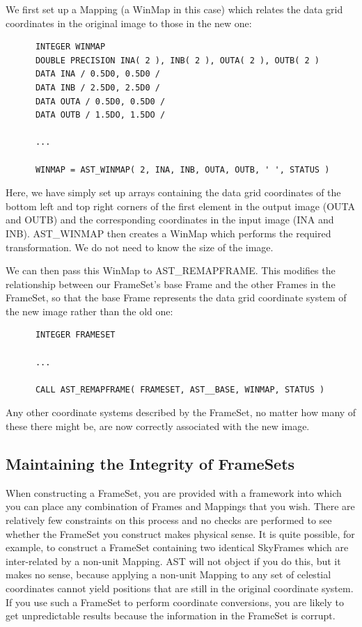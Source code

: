\documentclass[twoside,11pt]{article}
\newcommand{\htmlref}[2]{#1}
\begin{document}
We first set up a \htmlref{Mapping}{Mapping} (a \htmlref{WinMap}{WinMap} in this case) which relates the
data grid coordinates in the original image to those in the new one:

\small
\begin{verbatim}
      INTEGER WINMAP
      DOUBLE PRECISION INA( 2 ), INB( 2 ), OUTA( 2 ), OUTB( 2 )
      DATA INA / 0.5D0, 0.5D0 /
      DATA INB / 2.5D0, 2.5D0 /
      DATA OUTA / 0.5D0, 0.5D0 /
      DATA OUTB / 1.5DO, 1.5DO /

      ...

      WINMAP = AST_WINMAP( 2, INA, INB, OUTA, OUTB, ' ', STATUS )
\end{verbatim}
\normalsize

Here, we have simply set up arrays containing the data grid
coordinates of the bottom left and top right corners of the first
element in the output image (OUTA and OUTB) and the corresponding
coordinates in the input image (INA and INB). \htmlref{AST\_WINMAP}{AST_WINMAP} then creates
a WinMap which performs the required transformation. We do not need to
know the size of the image.

We can then pass this WinMap to AST\_REMAPFRAME. This modifies the
relationship between our FrameSet's base \htmlref{Frame}{Frame} and the other Frames in
the FrameSet, so that the base Frame represents the data grid
coordinate system of the new image rather than the old one:

\small
\begin{verbatim}
      INTEGER FRAMESET

      ...

      CALL AST_REMAPFRAME( FRAMESET, AST__BASE, WINMAP, STATUS )
\end{verbatim}
\normalsize

Any other coordinate systems described by the FrameSet, no matter how
many of these there might be, are now correctly associated with the
new image.

\subsection{\label{ss:framesetintegrity}Maintaining the Integrity of FrameSets}

When constructing a \htmlref{FrameSet}{FrameSet}, you are provided with a framework into
which you can place any combination of Frames and Mappings that you
wish. There are relatively few constraints on this process and no
checks are performed to see whether the FrameSet you construct makes
physical sense.  It is quite possible, for example, to construct a
FrameSet containing two identical SkyFrames which are inter-related by
a non-unit \htmlref{Mapping}{Mapping}. AST will not object if you do this, but it makes
no sense, because applying a non-unit Mapping to any set of celestial
coordinates cannot yield positions that are still in the original
coordinate system.  If you use such a FrameSet to perform coordinate
conversions, you are likely to get unpredictable results because the
information in the FrameSet is corrupt.
\end{document}

